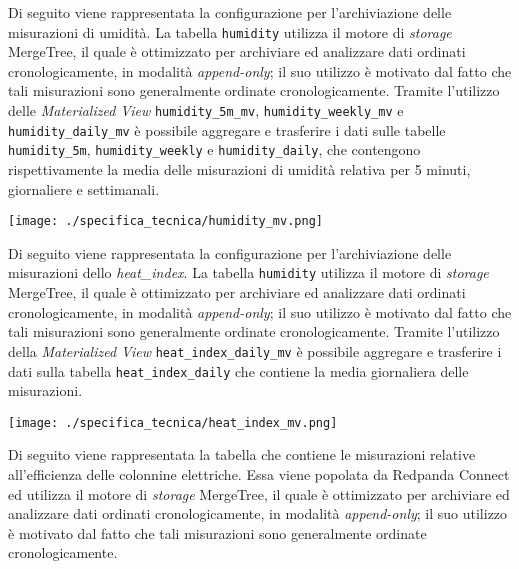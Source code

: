 Di seguito viene rappresentata la configurazione per l'archiviazione delle misurazioni di umidità. La tabella \texttt{humidity} utilizza il motore di \textit{storage}
MergeTree, il quale è ottimizzato per archiviare ed analizzare dati ordinati cronologicamente, in modalità \textit{append-only}; il suo
utilizzo è motivato dal fatto che tali misurazioni sono generalmente ordinate cronologicamente.
Tramite l'utilizzo delle \textit{Materialized View} \texttt{humidity\_5m\_mv}, \texttt{humidity\_weekly\_mv} e \texttt{humidity\_daily\_mv}
è possibile aggregare e trasferire i dati sulle tabelle \texttt{humidity\_5m}, \texttt{humidity\_weekly} e \texttt{humidity\_daily},
che contengono rispettivamente la media delle misurazioni di umidità relativa per 5 minuti, giornaliere e settimanali.
\begin{center}
	\texttt{[image: ./specifica\_tecnica/humidity\_mv.png]}
\end{center}

Di seguito viene rappresentata la configurazione per l'archiviazione delle misurazioni dello \textit{heat\_index}. La tabella \texttt{humidity} utilizza il motore di \textit{storage}
MergeTree, il quale è ottimizzato per archiviare ed analizzare dati ordinati cronologicamente, in modalità \textit{append-only}; il suo
utilizzo è motivato dal fatto che tali misurazioni sono generalmente ordinate cronologicamente.
Tramite l'utilizzo della \textit{Materialized View} \texttt{heat\_index\_daily\_mv} è possibile aggregare e trasferire i dati sulla tabella \texttt{heat\_index\_daily}
che contiene la media giornaliera delle misurazioni.

\begin{center}
	\texttt{[image: ./specifica\_tecnica/heat\_index\_mv.png]}
\end{center}

Di seguito viene rappresentata la tabella che contiene le misurazioni relative all'efficienza delle colonnine elettriche. Essa viene popolata da Redpanda Connect ed utilizza il motore di \textit{storage}
MergeTree, il quale è ottimizzato per archiviare ed analizzare dati ordinati cronologicamente, in modalità \textit{append-only}; il suo
utilizzo è motivato dal fatto che tali misurazioni sono generalmente ordinate cronologicamente.

